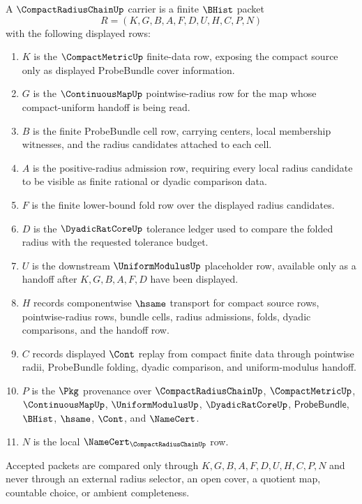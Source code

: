 \begin{definition}
\label{def:compact-radius-chain-carrier}
A $\CompactRadiusChainUp$ carrier is a finite $\BHist$ packet
$$
R=(K,G,B,A,F,D,U,H,C,P,N)
$$
with the following displayed rows:
\begin{enumerate}
\item $K$ is the $\CompactMetricUp$ finite-data row, exposing the compact source only as displayed ProbeBundle cover information.
\item $G$ is the $\ContinuousMapUp$ pointwise-radius row for the map whose compact-uniform handoff is being read.
\item $B$ is the finite ProbeBundle cell row, carrying centers, local membership witnesses, and the radius candidates attached to each cell.
\item $A$ is the positive-radius admission row, requiring every local radius candidate to be visible as finite rational or dyadic comparison data.
\item $F$ is the finite lower-bound fold row over the displayed radius candidates.
\item $D$ is the $\DyadicRatCoreUp$ tolerance ledger used to compare the folded radius with the requested tolerance budget.
\item $U$ is the downstream $\UniformModulusUp$ placeholder row, available only as a handoff after $K,G,B,A,F,D$ have been displayed.
\item $H$ records componentwise $\hsame$ transport for compact source rows, pointwise-radius rows, bundle cells, radius admissions, folds, dyadic comparisons, and the handoff row.
\item $C$ records displayed $\Cont$ replay from compact finite data through pointwise radii, ProbeBundle folding, dyadic comparison, and uniform-modulus handoff.
\item $P$ is the $\Pkg$ provenance over $\CompactRadiusChainUp$, $\CompactMetricUp$, $\ContinuousMapUp$, $\UniformModulusUp$, $\DyadicRatCoreUp$, $\mathsf{ProbeBundle}$, $\BHist$, $\hsame$, $\Cont$, and $\NameCert$.
\item $N$ is the local $\NameCert_{\CompactRadiusChainUp}$ row.
\end{enumerate}
Accepted packets are compared only through $K,G,B,A,F,D,U,H,C,P,N$ and never through an external radius selector, an open cover, a quotient map, countable choice, or ambient completeness.
\end{definition}

